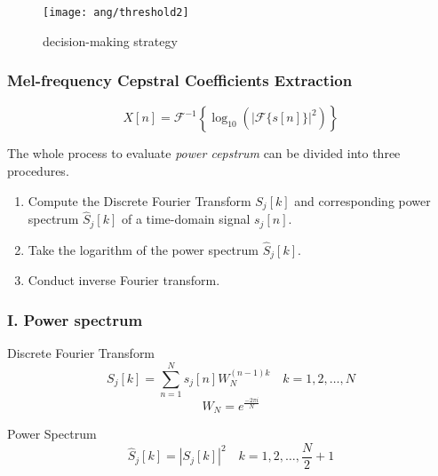 \begin{frame}
\begin{figure}[H]
\centering
\texttt{[image: ang/threshold2]}
\caption{decision-making strategy}
\end{figure}
\end{frame}


\begin{frame}
\frametitle{Mel-frequency Cepstral Coefficients Extraction}
\begin{equation}
X[n] = \mathcal{F}^{-1} \left\{\log_{10} \left( |\mathcal{F}\{s[n]\}|^2 \right) \right\}
\end{equation}
\vspace{10pt}

The whole process to evaluate \textit{power cepstrum} can be divided into three procedures.
\begin{enumerate}
\item Compute the Discrete Fourier Transform $S_j[k]$ and corresponding power spectrum $\hat{S}_j[k]$ of a time-domain signal $s_j[n]$.
\item Take the logarithm of the power spectrum $\hat{S}_j[k]$.
\item Conduct inverse Fourier transform.
\end{enumerate}
\end{frame}


\begin{frame}
\frametitle{I. Power spectrum}

Discrete Fourier Transform
\begin{equation}
S_j[k] = \sum_{n=1}^{N} s_j[n] W_N^{(n-1) k} \quad k = 1, 2, \dots, N
\end{equation}
\begin{equation}
W_N = e^{\frac{- 2\pi i}{N}}
\end{equation}

Power Spectrum
\begin{equation}
\hat{S}_j[k] = |S_j[k]|^2 \quad k = 1, 2, \dots, \frac{N}{2} + 1
\end{equation}
\end{frame}


